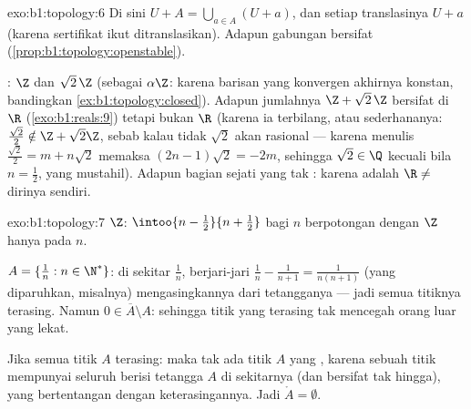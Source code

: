\begin{solution}{exo:b1:topology:6}
Di sini $U + A = \bigcup_{a \in A} (U + a)$, dan setiap translasinya $U + a$
 (karena sertifikat  ikut ditranslasikan). Adapun gabungan  bersifat
 (\cref{prop:b1:topology:openstable}).

: $\Z$ dan $\sqrt 2\,\Z$  (sebagai $\alpha\Z$:
karena barisan yang konvergen akhirnya konstan, bandingkan
\cref{ex:b1:topology:closed}). Adapun jumlahnya $\Z + \sqrt 2\,\Z$ bersifat 
di $\R$ (\cref{exo:b1:reals:9}) tetapi bukan $\R$ (karena ia terbilang, atau
sederhananya: $\frac{\sqrt 2}{2} \notin \Z + \sqrt2\Z$, sebab kalau tidak $\sqrt 2$
akan rasional --- karena menulis $\frac{\sqrt2}{2} = m + n\sqrt 2$
memaksa $(2n - 1)\sqrt 2 = -2m$, sehingga $\sqrt 2 \in \Q$ kecuali bila $n =
\frac12$, yang mustahil). Adapun  bagian sejati yang  tak : karena
 adalah $\R \neq$ dirinya sendiri.
\end{solution}

\begin{solution}{exo:b1:topology:7}
$\Z$:  $\intoo{n - \frac12}{n + \frac12}$ bagi $n$
berpotongan dengan $\Z$ hanya pada $n$.

$A = \{\frac1n : n \in \N^*\}$: di sekitar $\frac 1n$,  berjari-jari
$\frac{1}{n} - \frac{1}{n+1} = \frac{1}{n(n+1)}$ (yang diparuhkan, misalnya)
mengasingkannya dari tetangganya --- jadi semua titiknya terasing. Namun $0 \in
\overline A \setminus A$: sehingga titik yang terasing tak mencegah orang luar
yang lekat.

Jika semua titik $A$ terasing: maka tak ada titik $A$ yang , karena
sebuah titik  mempunyai seluruh  berisi tetangga $A$ di sekitarnya
(dan  bersifat tak hingga), yang bertentangan dengan keterasingannya. Jadi $\mathring A
= \emptyset$.
\end{solution}


